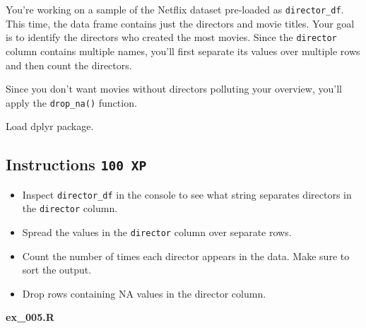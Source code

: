 \documentclass[
  letterpaper,
  DIV=11,
  numbers=noendperiod]{scrreprt}
\providecommand{\tightlist}{%
  \setlength{\itemsep}{0pt}\setlength{\parskip}{0pt}}\usepackage{longtable,booktabs,array}
\begin{document}
You're working on a sample of the Netflix dataset pre-loaded as
\texttt{director\_df}. This time, the data frame contains just the
directors and movie titles. Your goal is to identify the directors who
created the most movies. Since the \texttt{director} column contains
multiple names, you'll first separate its values over multiple rows and
then count the directors.

Since you don't want movies without directors polluting your overview,
you'll apply the \texttt{drop\_na()} function.

Load dplyr package.

\hypertarget{instructions-100-xp-4}{%
\subsection*{\texorpdfstring{Instructions
\texttt{100\ XP}}{Instructions 100 XP}}\label{instructions-100-xp-4}}

\begin{itemize}
\tightlist
\item
  Inspect \texttt{director\_df} in the console to see what string
  separates directors in the \texttt{director} column.
\item
  Spread the values in the \texttt{director} column over separate rows.
\item
  Count the number of times each director appears in the data. Make sure
  to sort the output.
\item
  Drop rows containing NA values in the director column.
\end{itemize}

\textbf{ex\_005.R}
\end{document}

